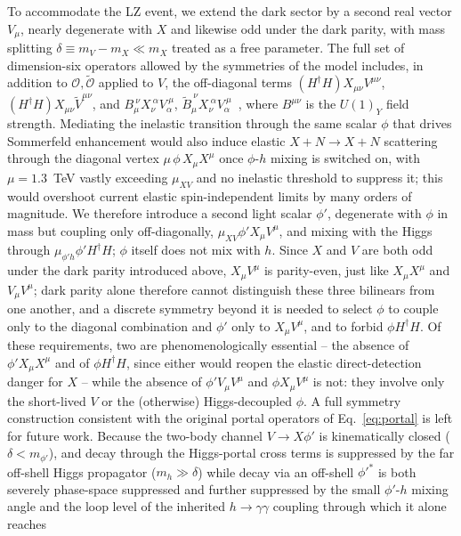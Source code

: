\documentclass[aps,prl,twocolumn,superscriptaddress,nofootinbib]{revtex4-2}
\begin{document}
To accommodate the LZ event, we extend the dark sector by a second real
vector $V_\mu$, nearly degenerate with $X$ and likewise odd under the
dark parity, with mass splitting
$\delta\equiv m_V-m_X\ll m_X$ treated as a free parameter. The full set
of dimension-six operators allowed by the symmetries of the model
includes, in addition to $\mathcal O,\tilde{\mathcal O}$ applied to $V$,
the off-diagonal terms $(H^\dagger H)X_{\mu\nu}V^{\mu\nu}$,
$(H^\dagger H)X_{\mu\nu}\tilde V^{\mu\nu}$, and
$B_\mu^{\ \nu}X_\nu^{\ \alpha}V_\alpha^{\ \mu}$,
$\tilde B_\mu^{\ \nu}X_\nu^{\ \alpha}V_\alpha^{\ \mu}$~\cite{Aebischer2022},
where $B^{\mu\nu}$ is the $U(1)_Y$ field strength. Mediating the
inelastic transition through the same scalar $\phi$ that drives
Sommerfeld enhancement would also induce elastic $X+N\to X+N$
scattering through the diagonal vertex $\mu\,\phi\,X_\mu X^\mu$ once
$\phi$-$h$ mixing is switched on, with $\mu=1.3$~TeV vastly exceeding
$\mu_{XV}$ and no inelastic threshold to suppress it; this would
overshoot current elastic spin-independent limits by many orders of
magnitude. We therefore introduce a second light scalar $\phi'$,
degenerate with $\phi$ in mass but coupling only off-diagonally,
$\mu_{XV}\phi' X_\mu V^\mu$, and mixing with the Higgs through
$\mu_{\phi'h}\phi' H^\dagger H$; $\phi$ itself does not mix with $h$.
Since $X$ and $V$ are both odd under the dark parity introduced
above, $X_\mu V^\mu$ is parity-even, just like $X_\mu X^\mu$ and
$V_\mu V^\mu$; dark parity alone therefore cannot distinguish these
three bilinears from one another, and a discrete symmetry beyond it is
needed to select $\phi$ to couple only to the diagonal combination and
$\phi'$ only to $X_\mu V^\mu$, and to forbid $\phi H^\dagger H$. Of
these requirements, two
are phenomenologically essential -- the absence of $\phi' X_\mu X^\mu$
and of $\phi H^\dagger H$, since either would reopen the elastic
direct-detection danger for $X$ -- while the absence of $\phi' V_\mu
V^\mu$ and
$\phi X_\mu V^\mu$ is not: they involve only the short-lived $V$ or
the (otherwise) Higgs-decoupled $\phi$. A full symmetry construction
consistent
with the original portal operators of Eq.~\eqref{eq:portal} is left
for future work. Because
the two-body channel $V\to X\phi'$ is kinematically closed
($\delta<m_{\phi'}$), and
decay through the Higgs-portal cross terms is suppressed by the far
off-shell Higgs propagator ($m_h\gg\delta$) while decay via an
off-shell $\phi'^*$ is both severely phase-space suppressed and further
suppressed by the small $\phi'$-$h$ mixing angle and the loop level of
the inherited $h\to\gamma\gamma$ coupling through which it alone reaches
\end{document}
